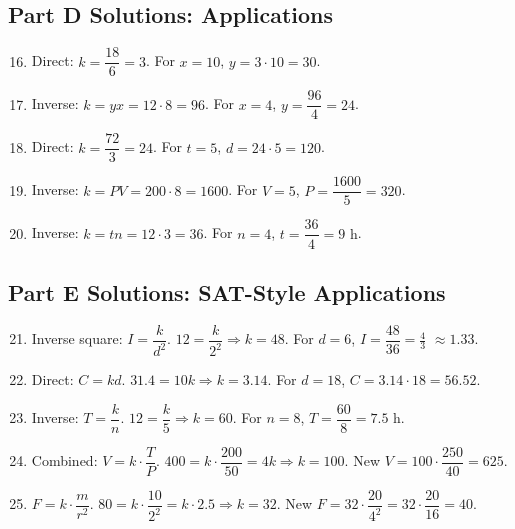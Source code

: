\documentclass[14pt]{extarticle}
\begin{document}
\subsection*{Part D Solutions: Applications}
\begin{enumerate}
  \setcounter{enumi}{15}
  \item Direct: \(k=\dfrac{18}{6}=3\). For \(x=10\), \(y=3\cdot10=\boxed{30}\).
  \item Inverse: \(k=yx=12\cdot8=96\). For \(x=4\), \(y=\dfrac{96}{4}=\boxed{24}\).
  \item Direct: \(k=\dfrac{72}{3}=24\). For \(t=5\), \(d=24\cdot5=\boxed{120}\).
  \item Inverse: \(k=PV=200\cdot8=1600\). For \(V=5\), \(P=\dfrac{1600}{5}=\boxed{320}\).
  \item Inverse: \(k=tn=12\cdot3=36\). For \(n=4\), \(t=\dfrac{36}{4}=\boxed{9\text{ h}}\).
\end{enumerate}

\subsection*{Part E Solutions: SAT-Style Applications}
\begin{enumerate}
  \setcounter{enumi}{20}
  \item Inverse square: \(I=\dfrac{k}{d^2}\). \(12=\dfrac{k}{2^2} \Rightarrow k=48\). For \(d=6\), \(I=\dfrac{48}{36}=\boxed{\tfrac{4}{3}}\) \(\approx 1.33\).
  \item Direct: \(C=kd\). \(31.4=10k \Rightarrow k=3.14\). For \(d=18\), \(C=3.14\cdot18=\boxed{56.52}\).
  \item Inverse: \(T=\dfrac{k}{n}\). \(12=\dfrac{k}{5} \Rightarrow k=60\). For \(n=8\), \(T=\dfrac{60}{8}=\boxed{7.5\text{ h}}\).
  \item Combined: \(V=k\cdot \dfrac{T}{P}\). \(400=k\cdot \dfrac{200}{50}=4k \Rightarrow k=100\). New \(V=100\cdot \dfrac{250}{40}=\boxed{625}\).
  \item \(F=k\cdot\dfrac{m}{r^2}\). \(80=k\cdot\dfrac{10}{2^2}=k\cdot2.5 \Rightarrow k=32\). New \(F=32\cdot\dfrac{20}{4^2}=32\cdot\dfrac{20}{16}=\boxed{40}\).
\end{enumerate}




\end{document}
